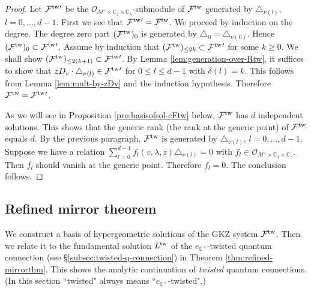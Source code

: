\documentclass[11pt]{amsart}
\theoremstyle{definition} %
\theoremstyle{remark} %
\newcommand{\CC}{\mathbb C}
\newcommand{\tw}{{\rm tw}}
\newcommand{\cO}{\mathcal{O}}
\newcommand{\cMo}{\mathcal{M}^\circ}
\newcommand{\cF}{\mathcal{F}}
\begin{document}
\begin{proof} 
Let $\cF^\tw{}'$ be the 
$\cO_{\cMo\times \CC_z\times \CC_\lambda}$-submodule 
of $\cF^\tw$ 
generated by $\triangle_{\nu(l)}$, $l=0,\dots,d-1$. 
First we see that $\cF^\tw{}' = \cF^\tw$. 
We proceed by induction on the degree. 
The degree zero part $(\cF^\tw)_0$ is 
generated by $\triangle_0 = \triangle_{\nu(0)}$. 
Hence $(\cF^\tw)_0\subset \cF^\tw{}'$. 
Assume by induction that 
$(\cF^\tw)_{\le 2 k}\subset \cF^\tw{}'$ 
for some $k\ge 0$. 
We shall show $(\cF^\tw)_{\le 2 (k+1)} \subset \cF^\tw{}'$. 
By Lemma \ref{lem:generation-over-Rtw}, 
it suffices to show that $zD_v\cdot \triangle_{\nu(l)} \in \cF^\tw{}'$ 
for $0\le l\le d-1$ with $\delta(l) =k$. 
This follows from Lemma \ref{lem:mult-by-zDv} 
and the induction hypothesis. 
Therefore $\cF^\tw = \cF^\tw{}'$. 

As we will see in Proposition \ref{pro:basisofsol-cFtw} below, 
$\cF^\tw$ has $d$ independent solutions. 
This shows that the generic rank (the rank at the generic 
point) of $\cF^\tw$ equals $d$. 
By the previous paragraph, $\cF^\tw$ is generated by 
$\triangle_{\nu(l)}$, $l=0,\dots,d-1$. 
Suppose we have a relation 
$\sum_{l=0}^{d-1} f_l(v,\lambda,z) \triangle_{\nu(l)}=0$ 
with $f_l \in \cO_{\cMo\times \CC_\lambda \times \CC_z}$. 
Then $f_l$ should vanish at the generic point. 
Therefore $f_l =0$. The conclusion follows. 
\end{proof} 


\subsection{Refined mirror theorem} 
\label{subsec:refined-mirrorthm}
We construct a basis of hypergeometric solutions of 
the GKZ system $\cF^\tw$. 
Then we relate it to the fundamental solution $L^\tw$ 
of the $e_{\CC^\times}$-twisted quantum connection 
(see \S \ref{subsec:twisted-q-connection}) 
in Theorem \ref{thm:refined-mirrorthm}. 
This shows the analytic continuation of 
\emph{twisted} quantum connections. 
(In this section ``twisted" always means ``$e_{\CC^\times}$-twisted".) 
\end{document}
